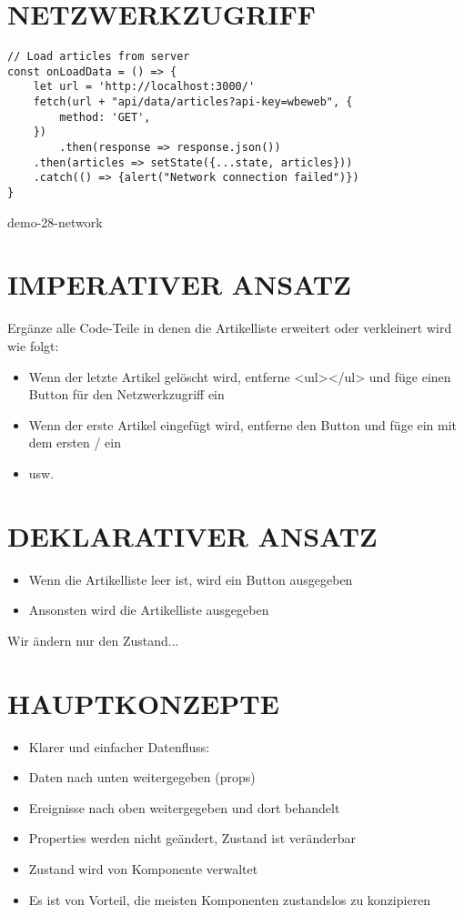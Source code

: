 \section*{NETZWERKZUGRIFF}
\begin{verbatim}
// Load articles from server
const onLoadData = () => {
    let url = 'http://localhost:3000/'
    fetch(url + "api/data/articles?api-key=wbeweb", {
        method: 'GET',
    })
        .then(response => response.json())
    .then(articles => setState({...state, articles}))
    .catch(() => {alert("Network connection failed")})
}
\end{verbatim}

demo-28-network

\section*{IMPERATIVER ANSATZ}
Ergänze alle Code-Teile in denen die Artikelliste erweitert oder verkleinert wird wie folgt:

\begin{itemize}
  \item Wenn der letzte Artikel gelöscht wird, entferne <uıl></ul> und füge einen Button für den Netzwerkzugriff ein
  \item Wenn der erste Artikel eingefügt wird, entferne den Button und füge ein  mit dem ersten / ein
  \item usw.
\end{itemize}

\section*{DEKLARATIVER ANSATZ}
\begin{itemize}
  \item Wenn die Artikelliste leer ist, wird ein Button ausgegeben
  \item Ansonsten wird die Artikelliste ausgegeben
\end{itemize}

Wir ändern nur den Zustand...

\section*{HAUPTKONZEPTE}
\begin{itemize}
  \item Klarer und einfacher Datenfluss:
  \item Daten nach unten weitergegeben (props)
  \item Ereignisse nach oben weitergegeben und dort behandelt
  \item Properties werden nicht geändert, Zustand ist veränderbar
  \item Zustand wird von Komponente verwaltet
  \item Es ist von Vorteil, die meisten Komponenten zustandslos zu konzipieren
\end{itemize}

